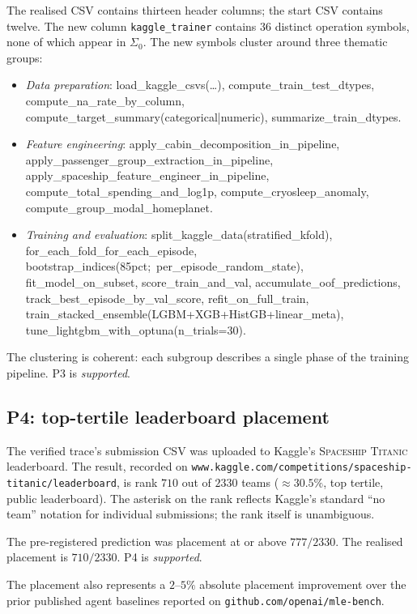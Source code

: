 The realised CSV contains thirteen header columns; the start
CSV contains twelve.  The new column \texttt{kaggle\_trainer}
contains 36 distinct operation symbols, none of which appear in
$\Sigma_0$.  The new symbols cluster around three thematic
groups:
\begin{itemize}
\item \emph{Data preparation}: \textsf{load\_kaggle\_csvs(\dots)},
\textsf{compute\_train\_test\_dtypes},
\textsf{compute\_na\_rate\_by\_column},
\textsf{compute\_target\_summary(categorical|numeric)},
\textsf{summarize\_train\_dtypes}.
\item \emph{Feature engineering}:
\textsf{apply\_cabin\_decomposition\_in\_pipeline},
\textsf{apply\_passenger\_group\_extraction\_in\_pipeline},
\textsf{apply\_spaceship\_feature\_engineer\_in\_pipeline},
\textsf{compute\_total\_spending\_and\_log1p},
\textsf{compute\_cryosleep\_anomaly},
\textsf{compute\_group\_modal\_homeplanet}.
\item \emph{Training and evaluation}:
\textsf{split\_kaggle\_data(stratified\_kfold)},
\textsf{for\_each\_fold\_for\_each\_episode},
\textsf{bootstrap\_indices(85pct;\ per\_episode\_random\_state)},
\textsf{fit\_model\_on\_subset},
\textsf{score\_train\_and\_val},
\textsf{accumulate\_oof\_predictions},
\textsf{track\_best\_episode\_by\_val\_score},
\textsf{refit\_on\_full\_train},
\textsf{train\_stacked\_ensemble(LGBM+XGB+HistGB+linear\_meta)},
\textsf{tune\_lightgbm\_with\_optuna(n\_trials=30)}.
\end{itemize}
The clustering is coherent: each subgroup describes a single
phase of the training pipeline.  P3 is \emph{supported}.

\subsection{P4: top-tertile leaderboard placement}

The verified trace's submission CSV was uploaded to Kaggle's
\textsc{Spaceship Titanic} leaderboard.  The result, recorded
on \texttt{www.kaggle.com/competitions/spaceship-titanic/leaderboard},
is rank $710$ out of $2330$ teams ($\approx\!30.5\%$, top
tertile, public leaderboard).  The asterisk on the rank reflects
Kaggle's standard ``no team'' notation for individual
submissions; the rank itself is unambiguous.

The pre-registered prediction was placement at or above
$777/2330$.  The realised placement is $710/2330$.  P4 is
\emph{supported}.

The placement also represents a $2$--$5\%$ absolute placement
improvement over the prior published agent baselines reported on
\texttt{github.com/openai/mle-bench}.

